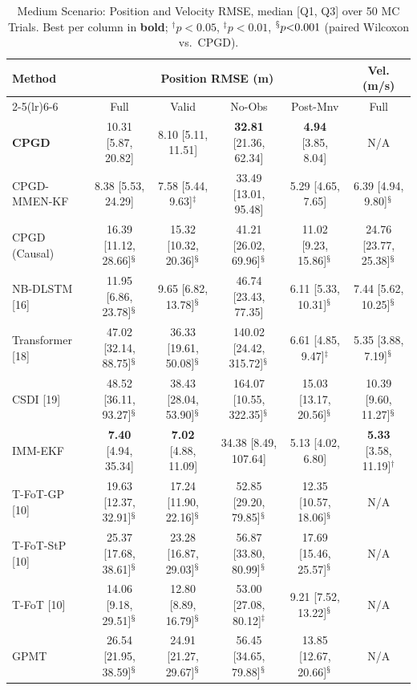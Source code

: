 \begin{table}[htbp]\centering
\caption{Medium Scenario: Position and Velocity RMSE, median [Q1, Q3] over 50 MC Trials. Best per column in \textbf{bold}; $^{\dagger}p{<}0.05$, $^{\ddagger}p{<}0.01$, $^{\mathsection}p{<}0.001$ (paired Wilcoxon vs.\ CPGD).}
\label{tab:medium_results}
\setlength{\tabcolsep}{4pt}
\centering\small\begin{tabular}{lccccc}
\toprule
\multirow{2}{*}{Method} & \multicolumn{4}{c}{Position RMSE (m)} & Vel. (m/s) \\
\cmidrule(lr){2-5}\cmidrule(lr){6-6}
& Full & Valid & No-Obs & Post-Mnv & Full \\
\midrule
\textbf{CPGD} & 10.31 [5.87, 20.82] & 8.10 [5.11, 11.51] & \textbf{32.81} [21.36, 62.34] & \textbf{4.94} [3.85, 8.04] & N/A \\
CPGD-MMEN-KF & 8.38 [5.53, 24.29] & 7.58 [5.44, 9.63]$^{\ddagger}$ & 33.49 [13.01, 95.48] & 5.29 [4.65, 7.65] & 6.39 [4.94, 9.80]$^{\mathsection}$ \\
CPGD (Causal) & 16.39 [11.12, 28.66]$^{\mathsection}$ & 15.32 [10.32, 20.36]$^{\mathsection}$ & 41.21 [26.02, 69.96]$^{\mathsection}$ & 11.02 [9.23, 15.86]$^{\mathsection}$ & 24.76 [23.77, 25.38]$^{\mathsection}$ \\
NB-DLSTM [16] & 11.95 [6.86, 23.78]$^{\mathsection}$ & 9.65 [6.82, 13.78]$^{\mathsection}$ & 46.74 [23.43, 77.35] & 6.11 [5.33, 10.31]$^{\mathsection}$ & 7.44 [5.62, 10.25]$^{\mathsection}$ \\
Transformer [18] & 47.02 [32.14, 88.75]$^{\mathsection}$ & 36.33 [19.61, 50.08]$^{\mathsection}$ & 140.02 [24.42, 315.72]$^{\mathsection}$ & 6.61 [4.85, 9.47]$^{\ddagger}$ & 5.35 [3.88, 7.19]$^{\mathsection}$ \\
CSDI [19] & 48.52 [36.11, 93.27]$^{\mathsection}$ & 38.43 [28.04, 53.90]$^{\mathsection}$ & 164.07 [10.55, 322.35]$^{\mathsection}$ & 15.03 [13.17, 20.56]$^{\mathsection}$ & 10.39 [9.60, 11.27]$^{\mathsection}$ \\
IMM-EKF & \textbf{7.40} [4.94, 35.34] & \textbf{7.02} [4.88, 11.09] & 34.38 [8.49, 107.64] & 5.13 [4.02, 6.80] & \textbf{5.33} [3.58, 11.19]$^{\dagger}$ \\
T-FoT-GP [10] & 19.63 [12.37, 32.91]$^{\mathsection}$ & 17.24 [11.90, 22.16]$^{\mathsection}$ & 52.85 [29.20, 79.85]$^{\mathsection}$ & 12.35 [10.57, 18.06]$^{\mathsection}$ & N/A \\
T-FoT-StP [10] & 25.37 [17.68, 38.61]$^{\mathsection}$ & 23.28 [16.87, 29.03]$^{\mathsection}$ & 56.87 [33.80, 80.99]$^{\mathsection}$ & 17.69 [15.46, 25.57]$^{\mathsection}$ & N/A \\
T-FoT [10] & 14.06 [9.18, 29.51]$^{\mathsection}$ & 12.80 [8.89, 16.79]$^{\mathsection}$ & 53.00 [27.08, 80.12]$^{\ddagger}$ & 9.21 [7.52, 13.22]$^{\mathsection}$ & N/A \\
GPMT & 26.54 [21.95, 38.59]$^{\mathsection}$ & 24.91 [21.27, 29.67]$^{\mathsection}$ & 56.45 [34.65, 79.88]$^{\mathsection}$ & 13.85 [12.67, 20.66]$^{\mathsection}$ & N/A \\
\bottomrule
\end{tabular}
\end{table}
